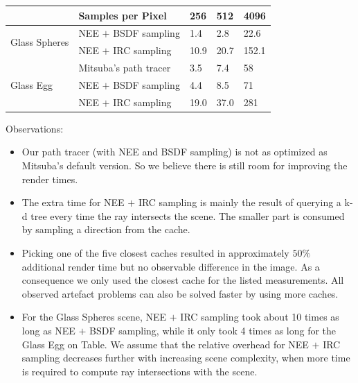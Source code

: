 \begin{table}[h]
\begin{tabular}{|l|llll|}
\hline
                               & Samples per Pixel     & 256  & 512  & 4096  \\ \hline
\multirow{2}{*}{Glass Spheres} & NEE $+$ BSDF sampling & 1.4  & 2.8  & 22.6  \\
                               & NEE $+$ IRC sampling  & 10.9 & 20.7 & 152.1 \\ \hline
\multirow{3}{*}{Glass Egg}     & Mitsuba's path tracer & 3.5  & 7.4  & 58    \\
                               & NEE $+$ BSDF sampling & 4.4  & 8.5  & 71    \\
                               & NEE $+$ IRC sampling  & 19.0 & 37.0 & 281   \\ \hline
\end{tabular}
\end{table}

Observations:

\begin{itemize}
\item Our path tracer (with NEE and BSDF sampling) is not as optimized as Mitsuba's default version. So we believe there is still room for improving the render times.
\item The extra time for NEE $+$ IRC sampling is mainly the result of querying a k-d tree every time the ray intersects the scene. The smaller part is consumed by sampling a direction from the cache.
\item Picking one of the five closest caches resulted in approximately $50\%$ additional render time but no observable difference in the image. As a consequence we only used the closest cache for the listed measurements. All observed artefact problems can also be solved faster by using more caches.
\item For the Glass Spheres scene, NEE $+$ IRC sampling took about 10 times as long as NEE $+$ BSDF sampling, while it only took 4 times as long for the Glass Egg on Table. We assume that the relative overhead for NEE $+$ IRC sampling decreases further with increasing scene complexity, when more time is required to compute ray intersections with the scene.
\end{itemize}
